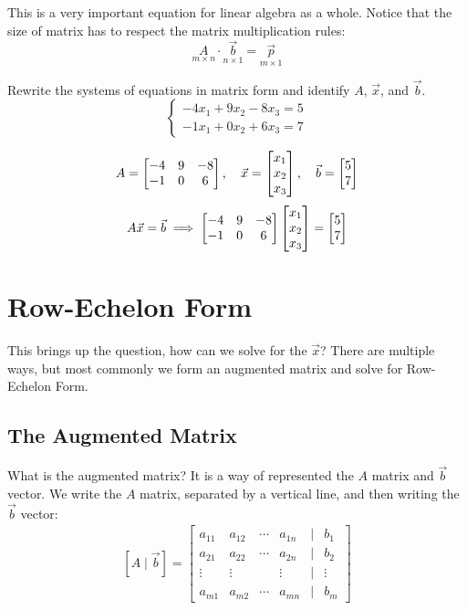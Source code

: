 This is a very important equation for linear algebra as a whole. Notice that the size of matrix has to respect the matrix multiplication rules:
\[\underset{m \times n}{A} \cdot \underset{n \times 1}{\vec{b}} = \underset{m\times 1}{\vec{p}}\]

\begin{Exercise}[title=Matrix Equation, label=matrixeq1]
       Rewrite the systems of equations in matrix form and identify $A$, $\vec{x}$, and $\vec{b}$. 
       \[\begin{cases}
       -4x_1 + 9x_2 - 8x_3= 5\\
       -1x_1 + 0x_2 + 6x_3= 7
       \end{cases}\]
\end{Exercise}

\begin{Answer}[ref=matrixeq1]
     \[A = \begin{bmatrix} -4 & 9 & -8 \\ -1 & 0 & 6 \end{bmatrix}, \quad \vec{x} = \begin{bmatrix} x_1 \\ x_2 \\ x_3 \end{bmatrix}, \quad \vec{b} = \begin{bmatrix} 5 \\ 7 \end{bmatrix}\]
     \[A\vec{x}=\vec{b} \implies \begin{bmatrix} -4 & 9 & -8 \\ -1 & 0 & 6 \end{bmatrix}\begin{bmatrix} x_1 \\ x_2 \\ x_3 \end{bmatrix} = \begin{bmatrix} 5 \\ 7 \end{bmatrix}\]
\end{Answer}

\section{Row-Echelon Form}
This brings up the question, how can we solve for the $\vec{x}$? There are multiple ways, but most commonly we form an augmented matrix and solve for Row-Echelon Form. 
\subsection{The Augmented Matrix}
What is the augmented matrix? It is a way of represented the $A$ matrix and $\vec{b}$ vector. We write the $A$ matrix, separated by a vertical line, and then writing the $\vec{b}$ vector:
$$\begin{array}{c} [A \mid \vec{b}] =
\begin{bmatrix}
a_{11} & a_{12} & \cdots & a_{1n} & \vert & b_1 \\
a_{21} & a_{22} & \cdots & a_{2n} & \vert & b_2 \\
\vdots & \vdots &        & \vdots & \vert & \vdots \\
a_{m1} & a_{m2} & \cdots & a_{mn} & \vert & b_m
\end{bmatrix} \end{array}$$

